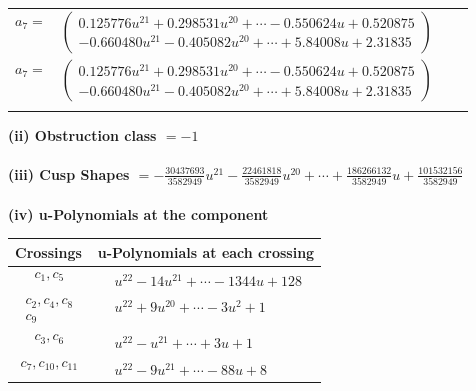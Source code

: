 \documentclass[1p]{elsarticle_modified}
\theoremstyle{definition}
\begin{document}
\begin{tabular}{m{7pt} m{180pt} m{7pt} m{180pt} }
\flushright $a_{7}=$&$\begin{pmatrix}0.125776 u^{21}+0.298531 u^{20}+\cdots-0.550624 u+0.520875\\-0.660480 u^{21}-0.405082 u^{20}+\cdots+5.84008 u+2.31835\end{pmatrix}$\\ \flushright $a_{7}=$&$\begin{pmatrix}0.125776 u^{21}+0.298531 u^{20}+\cdots-0.550624 u+0.520875\\-0.660480 u^{21}-0.405082 u^{20}+\cdots+5.84008 u+2.31835\end{pmatrix}$\\&\end{tabular}
\flushleft \textbf{(ii) Obstruction class $= -1$}\\~\\
\flushleft \textbf{(iii) Cusp Shapes $= -\frac{30437693}{3582949} u^{21}-\frac{22461818}{3582949} u^{20}+\cdots+\frac{186266132}{3582949} u+\frac{101532156}{3582949}$}\\~\\
\newpage\renewcommand{\arraystretch}{1}
\flushleft \textbf{(iv) u-Polynomials at the component}\newline \\
\begin{tabular}{m{50pt}|m{274pt}}
Crossings & \hspace{64pt}u-Polynomials at each crossing \\
\hline $$\begin{aligned}c_{1},c_{5}\end{aligned}$$&$\begin{aligned}
&u^{22}-14 u^{21}+\cdots-1344 u+128
\end{aligned}$\\
\hline $$\begin{aligned}c_{2},c_{4},c_{8}\\c_{9}\end{aligned}$$&$\begin{aligned}
&u^{22}+9 u^{20}+\cdots-3 u^2+1
\end{aligned}$\\
\hline $$\begin{aligned}c_{3},c_{6}\end{aligned}$$&$\begin{aligned}
&u^{22}- u^{21}+\cdots+3 u+1
\end{aligned}$\\
\hline $$\begin{aligned}c_{7},c_{10},c_{11}\end{aligned}$$&$\begin{aligned}
&u^{22}-9 u^{21}+\cdots-88 u+8
\end{aligned}$\\
\hline
\end{tabular}\\~\\
\end{document}
